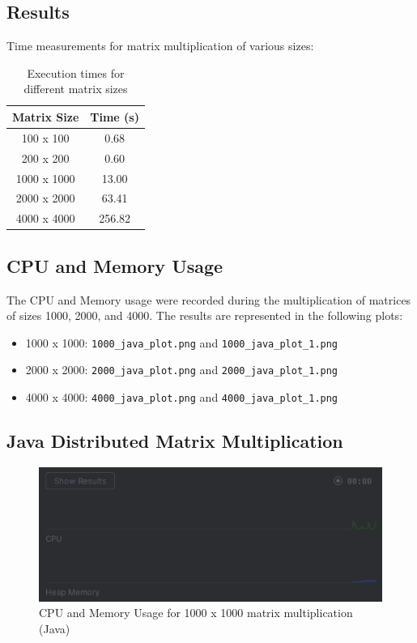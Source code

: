 \documentclass{article}
\begin{document}
\subsection{Results}
Time measurements for matrix multiplication of various sizes:
\begin{table}[H]
    \centering
    \begin{tabular}{|c|c|}
    \hline
    Matrix Size & Time (s) \\
    \hline
    100 x 100 & 0.68 \\
    200 x 200 & 0.60 \\
    1000 x 1000 & 13.00 \\
    2000 x 2000 & 63.41 \\
    4000 x 4000 & 256.82 \\
    \hline
    \end{tabular}
    \caption{Execution times for different matrix sizes}
\end{table}

\subsection{CPU and Memory Usage}
The CPU and Memory usage were recorded during the multiplication of matrices of sizes 1000, 2000, and 4000. The results are represented in the following plots:
\begin{itemize}
    \item 1000 x 1000: \texttt{1000\_java\_plot.png} and \texttt{1000\_java\_plot\_1.png}
    \item 2000 x 2000: \texttt{2000\_java\_plot.png} and \texttt{2000\_java\_plot\_1.png}
    \item 4000 x 4000: \texttt{4000\_java\_plot.png} and \texttt{4000\_java\_plot\_1.png}
\end{itemize}

\subsection{Java Distributed Matrix Multiplication}
\begin{figure}[H]
    \centering
    \includegraphics[width=\textwidth]{1000_java_plot.png}
    \caption{CPU and Memory Usage for 1000 x 1000 matrix multiplication (Java)}
\end{figure}
\end{document}
